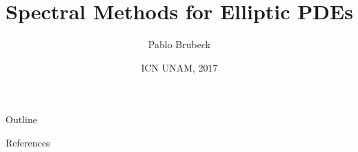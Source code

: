 \documentclass[xcolor={dvipsnames}]{beamer}
\title{Spectral Methods for Elliptic PDEs}
\author[P. Brubeck]{Pablo Brubeck}
\date[ITESM, 2017]{ICN UNAM, 2017}
\begin{document}
\begin{frame}
  \titlepage
\end{frame}

\begin{frame}{Outline}
  \tableofcontents
\end{frame}







\begin{frame}{References}
\nocite{*}


\end{frame}
\end{document}
